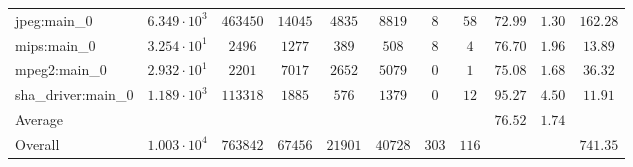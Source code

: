 \begin{tabular}{|l|c|c|c|c|c|c|c|c|c|c|}
jpeg:main\_0            & $ 6.349 \cdot 10^{3} $ & $ 463450 $ & $ 14045 $ & $ 4835  $ & $ 8819  $ & $ 8   $ & $ 58  $ & $ 72.99       $ & $ 1.30    $ & $ 162.28  $ \\
mips:main\_0            & $ 3.254 \cdot 10^{1} $ & $ 2496   $ & $ 1277  $ & $ 389   $ & $ 508   $ & $ 8   $ & $ 4   $ & $ 76.70       $ & $ 1.96    $ & $ 13.89   $ \\
mpeg2:main\_0           & $ 2.932 \cdot 10^{1} $ & $ 2201   $ & $ 7017  $ & $ 2652  $ & $ 5079  $ & $ 0   $ & $ 1   $ & $ 75.08       $ & $ 1.68    $ & $ 36.32   $ \\
sha\_driver:main\_0     & $ 1.189 \cdot 10^{3} $ & $ 113318 $ & $ 1885  $ & $ 576   $ & $ 1379  $ & $ 0   $ & $ 12  $ & $ 95.27       $ & $ 4.50    $ & $ 11.91   $ \\
\hline
Average                 & $                    $ & $        $ & $       $ & $       $ & $       $ & $     $ & $     $ & $ 76.52       $ & $ 1.74    $ & $         $ \\
\hline
Overall                 & $ 1.003 \cdot 10^{4} $ & $ 763842 $ & $ 67456 $ & $ 21901 $ & $ 40728 $ & $ 303 $ & $ 116 $ & $             $ & $         $ & $ 741.35  $ \\
\hline
\end{tabular}
